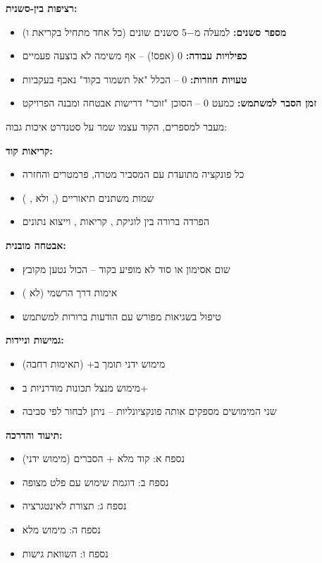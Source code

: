 \textbf{רציפות בין-סשנית:}
\begin{itemize}
  \item \textbf{מספר סשנים:} למעלה מ\num{-5} סשנים שונים (כל אחד מתחיל בקריאת  ו)
  \item \textbf{כפילויות עבודה:} \num{0} (אפס!) – אף משימה לא בוצעה פעמיים
  \item \textbf{טעויות חוזרות:} \num{0} – הכלל "אל תשמור  בקוד" נאכף בעקביות
  \item \textbf{זמן הסבר למשתמש:} כמעט \num{0} – הסוכן "זוכר" דרישות אבטחה ומבנה הפרויקט
\end{itemize}


מעבר למספרים, הקוד עצמו שמר על סטנדרט איכות גבוה:

\textbf{קריאות קוד:}
\begin{itemize}
  \item כל פונקציה מתועדת עם  המסביר מטרה, פרמטרים והחזרה
  \item שמות משתנים תיאוריים (,  ולא , )
  \item הפרדה ברורה בין לוגיקת , קריאות , וייצוא נתונים
\end{itemize}

\textbf{אבטחה מובנית:}
\begin{itemize}
  \item שום אסימון או סוד לא מופיע בקוד – הכול נטען מקובץ 
  \item אימות  דרך  הרשמי (לא )
  \item טיפול בשגיאות מפורש עם הודעות ברורות למשתמש
\end{itemize}

\textbf{גמישות וניידות:}
\begin{itemize}
  \item מימוש ידני תומך ב+ (תאימות רחבה)
  \item מימוש  מנצל תכונות מודרניות ב+
  \item שני המימושים מספקים אותה פונקציונליות – ניתן לבחור לפי סביבה
\end{itemize}

\textbf{תיעוד והדרכה:}
\begin{itemize}
  \item נספח א: קוד מלא + הסברים (מימוש ידני)
  \item נספח ב: דוגמת שימוש עם פלט מצופה
  \item נספח ג: תצורת  לאינטגרציה
  \item נספח ה: מימוש  מלא
  \item נספח ו: השוואת גישות
\end{itemize}

